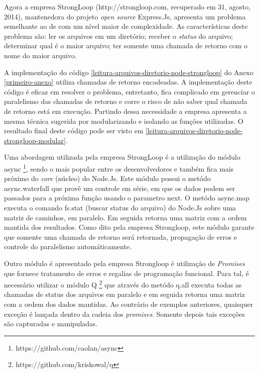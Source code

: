   Agora a empresa StrongLoop (http://strongloop.com, recuperado em 31, agosto, 2014), mantenedora do projeto \textit{open source}
  Express.Js, apresenta um problema semelhante ao de  com um nível maior de complexidade. 
  As características deste problema são: ler os arquivos em um diretório; receber o \textit{status} do arquivo;
  determinar qual é o maior arquivo; ter somente uma chamada de retorno com o nome do maior arquivo.
  
  A implementação do código \ref{leitura-arquivos-diretorio-node-strongloop} do Anexo \ref{primeiro-anexo}
  utiliza chamadas de retorno encadeadas. A implementação deste código é eficaz em resolver o problema, entretanto,
  fica complicado em gerenciar o paralelismo das chamadas de retorno e corre o risco de não saber qual chamada de retorno
  está em execução. Partindo dessa necessidade a empresa apresenta a mesma técnica sugerida por 
  modularizando e isolando as funções utilizadas. O resultado final deste código pode ser visto em 
  \ref{leitura-arquivos-diretorio-node-strongloop-modular}.
  
  Uma abordagem utilizada pela empresa StrongLoop é a utilização do módulo async \footnote{https://github.com/caolan/async},
  sendo o mais popular entre os desenvolvedores e também fica mais próximo do \textit{core} (núcleo) do Node.Js. Este módulo
  possui o metódo async.waterfall que provê um controle em série, em que os dados podem ser passados para a próxima função
  usando o parametro next. O metódo async.map executa o comando fs.stat (buscar status do arquivo) do Node.Js sobre uma matriz
  de caminhos, em paralelo. Em seguida retorna uma matriz com a ordem mantida dos resultados. Como dito pela empresa
  Strongloop, este módulo garante que somente uma chamada de retorno será retornada, propagação de erros e controle do 
  paralelismo automáticamente. 
  
  Outro módulo é apresentado pela empresa Strongloop é utilização de \textit{Promises} que fornece tratamento de erros
  e regalias de programação funcional. Para tal, é necessário utilizar o módulo Q \footnote{https://github.com/kriskowal/q}
  que através do metódo q.all executa todas as chamadas de status dos arquivos em paralelo e em seguida retorna uma matriz
  com a ordem dos dados mantidas. Ao contrário de exemplos anteriores, quaisquer exceção é lançada dentro da cadeia dos
  \textit{promises}. Somente depois tais exceções são capturadas e manipuladas.
  
